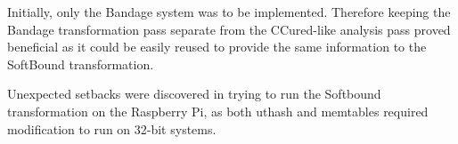 \documentclass[a4paper,12pt,twoside,openright]{report}
\begin{document}
Initially, only the Bandage system was to be implemented.
Therefore keeping the Bandage transformation pass separate from the CCured-like analysis pass proved beneficial as it could be easily reused to provide the same information to the SoftBound transformation.

Unexpected setbacks were discovered in trying to run the Softbound transformation on the Raspberry Pi, as both uthash and memtables required modification to run on 32-bit systems.

\appendix
\singlespacing

 
 
\end{document}
